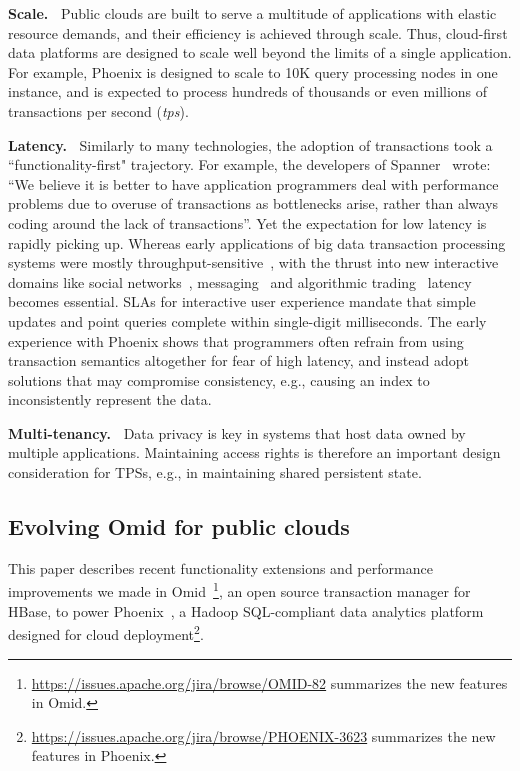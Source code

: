 {\bf Scale.\ } 
Public clouds  are built to  serve a multitude of applications 
with elastic resource demands, and their efficiency is achieved through  scale. 
Thus, cloud-first data platforms are  designed to scale well beyond the limits of a single application. 
For example, Phoenix is designed to scale to 10K query processing 
nodes in one instance, and is expected to   process hundreds
 of thousands or even millions of transactions per second ({\em tps}). 
 
{\bf Latency.\ }
Similarly to many technologies, the adoption of transactions took a  ``functionality-first" trajectory. 
For example, the developers of Spanner~\cite{Spanner2012} wrote: 
  ``We believe it
is better to have application programmers deal with performance problems due to overuse 
of transactions as bottlenecks arise, rather than always coding around the lack of transactions''. 
Yet the expectation for low latency is rapidly picking up. 
Whereas early applications of big data transaction processing systems were 
mostly throughput-sensitive~\cite{Percolator2010, Omid2017}, 
with the thrust into new interactive domains like social networks~\cite{chatter},  
messaging~\cite{Borthakur:2011} and algorithmic trading~\cite{opentsdb} latency becomes essential.  
SLAs for interactive user experience mandate that simple updates and point queries  complete within 
single-digit milliseconds. The early experience with Phoenix shows that programmers  often
refrain from using transaction semantics altogether for fear of high latency, 
and instead  adopt solutions that may compromise consistency, e.g., 
causing an index to inconsistently represent the data.

{\bf Multi-tenancy.\ } Data privacy is key in systems that host data owned by multiple applications.
Maintaining  access rights is therefore an important design consideration for TPSs, 
e.g., in maintaining shared persistent state. 

\subsection{Evolving Omid for public clouds}

This paper describes recent functionality extensions and performance improvements 
we made in Omid~\cite{omid}\footnote{\small{\url{https://issues.apache.org/jira/browse/OMID-82} summarizes 
the new features in Omid.}}, an open source transaction manager for HBase, to power 
Phoenix~\cite{phoenix},  a Hadoop SQL-compliant  data analytics platform designed 
for cloud deployment\footnote{\small{\url{https://issues.apache.org/jira/browse/PHOENIX-3623}
summarizes the new features in Phoenix.}}. 


